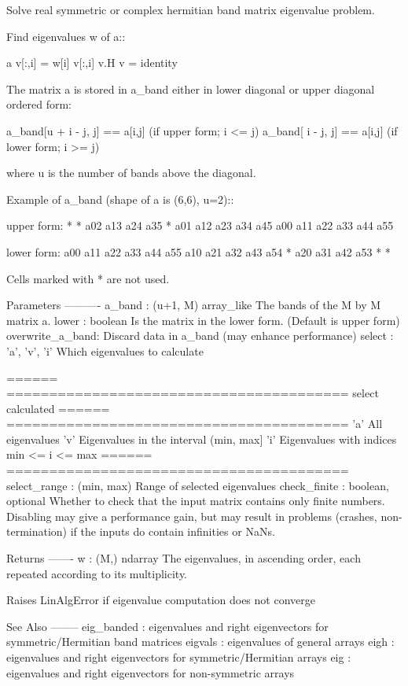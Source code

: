 \begin{DoxyVerb}Solve real symmetric or complex hermitian band matrix eigenvalue problem.

Find eigenvalues w of a::

    a v[:,i] = w[i] v[:,i]
    v.H v    = identity

The matrix a is stored in a_band either in lower diagonal or upper
diagonal ordered form:

    a_band[u + i - j, j] == a[i,j]        (if upper form; i <= j)
    a_band[    i - j, j] == a[i,j]        (if lower form; i >= j)

where u is the number of bands above the diagonal.

Example of a_band (shape of a is (6,6), u=2)::

    upper form:
    *   *   a02 a13 a24 a35
    *   a01 a12 a23 a34 a45
    a00 a11 a22 a33 a44 a55

    lower form:
    a00 a11 a22 a33 a44 a55
    a10 a21 a32 a43 a54 *
    a20 a31 a42 a53 *   *

Cells marked with * are not used.

Parameters
----------
a_band : (u+1, M) array_like
    The bands of the M by M matrix a.
lower : boolean
    Is the matrix in the lower form. (Default is upper form)
overwrite_a_band:
    Discard data in a_band (may enhance performance)
select : {'a', 'v', 'i'}
    Which eigenvalues to calculate

    ======  ========================================
    select  calculated
    ======  ========================================
    'a'     All eigenvalues
    'v'     Eigenvalues in the interval (min, max]
    'i'     Eigenvalues with indices min <= i <= max
    ======  ========================================
select_range : (min, max)
    Range of selected eigenvalues
check_finite : boolean, optional
    Whether to check that the input matrix contains only finite numbers.
    Disabling may give a performance gain, but may result in problems
    (crashes, non-termination) if the inputs do contain infinities or NaNs.

Returns
-------
w : (M,) ndarray
    The eigenvalues, in ascending order, each repeated according to its
    multiplicity.

Raises LinAlgError if eigenvalue computation does not converge

See Also
--------
eig_banded : eigenvalues and right eigenvectors for symmetric/Hermitian
    band matrices
eigvals : eigenvalues of general arrays
eigh : eigenvalues and right eigenvectors for symmetric/Hermitian arrays
eig : eigenvalues and right eigenvectors for non-symmetric arrays\end{DoxyVerb}
 \hypertarget{namespacescipy_1_1linalg_1_1decomp_a4587c8d8bb28100820eaef656b3e8ba8}{}
